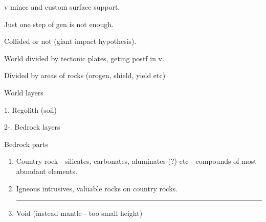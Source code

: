 \documentclass[12pt]{article}
\begin{document}

    v minec and custom surface support.

    Just one step of gen is not enough.

    Collided or not (giant impact hypothesis).

    World divided by tectonic plates, geting postf in v.

    Divided by areas of rocks (orogen, shield, yield etc)

    World layers

    1. Regolith (soil)

    2-\infty. Bedrock layers

    Bedrock parts

    \begin{enumerate}
    \item Country rock - silicates, carbonates, aluminates (?) etc - compounds of most abundant elements.
    \item Igneous intrusives, valuable rocks on country rocks. \\
    \noindent\rule{\textwidth}{0.4pt}
    \item Void (instead mantle - too small height)
    \end{enumerate}
\end{document}
